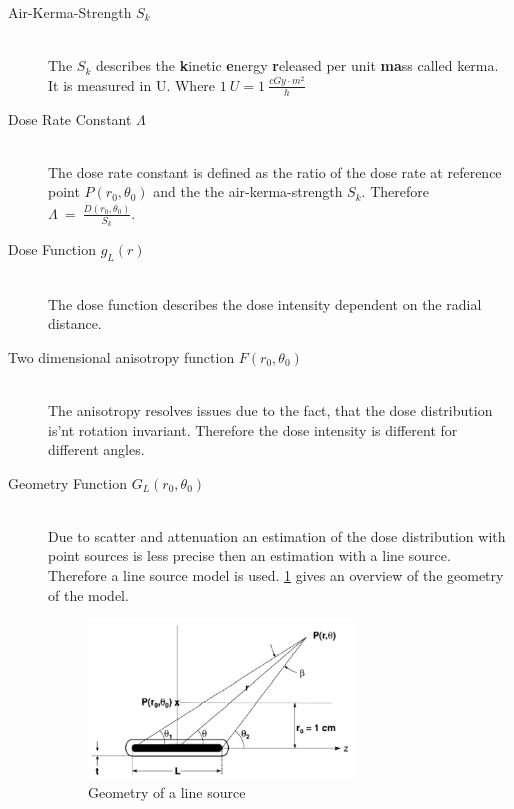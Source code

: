 \documentclass[12pt]{article}
\begin{document}
\begin{description}
\item[Air-Kerma-Strength $S_{k}$]~\\
The $S_{k}$ describes the \textbf{k}inetic \textbf{e}nergy \textbf{r}eleased per unit \textbf{ma}ss called kerma. It is measured in U. Where $1\ U =1 \ \frac{cGy \cdot m^{2}}{h} $   
\item[Dose Rate Constant $\Lambda$]~\\
The dose rate constant is defined as the ratio of the dose rate at reference point $ P(r_{0},\theta_{0})  $ and the the air-kerma-strength $S_{k}$. Therefore $ \Lambda \ = \ \frac{\dot{D}(r_{0},\theta_{0})}{S_{k}} $.



\item[Dose Function $g_{L}(r)$]~\\
The dose function describes the dose intensity dependent on the radial distance.


\item[Two dimensional anisotropy function $ F(r_{0},\theta_{0})$]~\\
The anisotropy resolves issues due to the fact, that the dose distribution is'nt rotation invariant. Therefore the dose intensity is different for different angles.


\item[Geometry Function $G_{L}(r_{0},\theta_{0})$ ]~\\
Due to scatter and attenuation an estimation of the dose distribution with point sources is less precise then an estimation with a line source. Therefore a line source model is used. \ref{fig:geometry} gives an overview of the geometry of the model.

\begin{figure}[hbtp]


\centering
\includegraphics[width=0.7\textwidth]{pictures/geometry}
\caption{Geometry of a line source}
\label{fig:geometry}	
\end{figure}

\end{description}
\newpage
\end{document}
